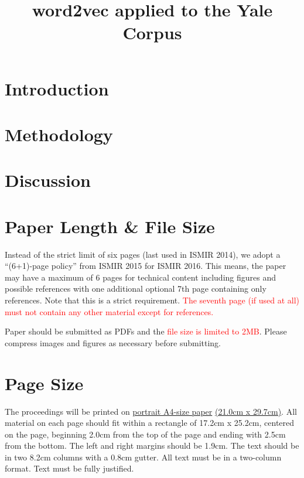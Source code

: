 \documentclass{article}
\title{word2vec applied to the Yale Corpus}
\begin{document}
%
\maketitle
%
\begin{abstract}
    
\end{abstract}
%
\section{Introduction}\label{sec:introduction}



\section{Methodology}\label{sec:methodology}



\section{Discussion}\label{sec:discussion}



\section{Paper Length \& File Size}
Instead of the strict limit of six pages (last used in ISMIR 2014), we adopt
a ``(6+1)-page policy'' from ISMIR 2015 for ISMIR 2016. This means, the paper may have a
maximum of 6 pages for technical content including figures and possible references
with one additional optional 7th page containing only references.
Note that this is a strict requirement.
\textcolor{red}{The seventh page (if used at all) must
not contain any other material except for references.}

Paper should be submitted as PDFs and the \textcolor{red}{file size is limited to 2MB}. Please compress images and figures as necessary before submitting.

\section{Page Size}\label{sec:page_size}

The proceedings will be printed on
 \underline{portrait A4-size paper} \underline{(21.0cm x 29.7cm)}.
All material on each page should fit within a rectangle of 17.2cm x 25.2cm,
centered on the page, beginning 2.0cm
from the top of the page and ending with 2.5cm from the bottom.
The left and right margins should be 1.9cm.
The text should be in two 8.2cm columns with a 0.8cm gutter.
All text must be in a two-column format.
Text must be fully justified.
\end{document}
